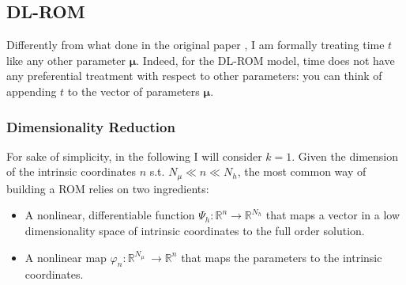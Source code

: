 \documentclass[11pt]{article}
\begin{document}
\subsection{DL-ROM}\label{sec:dlrom}
Differently from what done in the original paper \cite{fresca2021comprehensive}, I am formally treating time $t$ like any other parameter $\boldsymbol \mu$. Indeed, for the DL-ROM model, time does not have any preferential treatment with respect to other parameters: you can think of appending $t$ to the vector of parameters $\boldsymbol \mu$.
\subsubsection{Dimensionality Reduction}
For sake of simplicity, in the following I will consider $k=1$. Given the dimension of the intrinsic coordinates $n$ s.t. $N_\mu \ll n \ll N_h$, the most common way of building a ROM relies on two ingredients:
\begin{itemize}
    \item A nonlinear, differentiable function $\Psi_h: \mathbb R^{n} \rightarrow \mathbb R^{N_h}$ that maps a vector in a low dimensionality space of intrinsic coordinates to the full order solution. 
    \item A nonlinear map $\varphi_n : \mathbb R^{N_\mu} \ \rightarrow \mathbb R^{n}$ that maps the parameters to the intrinsic coordinates.
\end{itemize}
\end{document}

